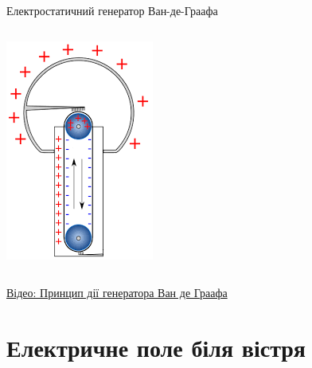 \documentclass[onlytextwidth]{beamer}
\begin{document}
\begin{frame}{Електростатичний генератор Ван-де-Граафа}{}
\begin{columns}
\begin{column}{0.29\linewidth}
			\includegraphics[width=\linewidth]{VanDeGraaf}
		\end{column}
	\end{columns}
	\begin{block}{}
		\href{https://www.youtube.com/watch?v=Xqt2gAalV4Y}{Відео: Принцип дії генератора Ван де
			Граафа}
	\end{block}
\end{frame}



\section{Електричне поле біля вістря}
\end{document}
